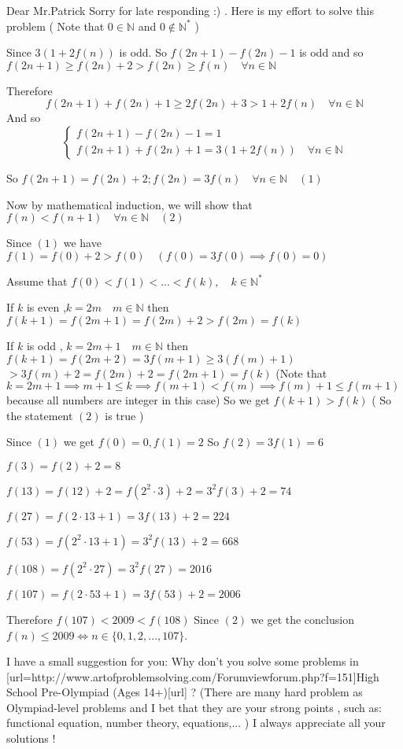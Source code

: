 \begin{solution}
	Dear Mr.Patrick
Sorry for late responding :) . 
Here is my effort  to solve this problem ( Note that $0\in\mathbb{N}$ and $0\notin\mathbb{N}^*$ ) 


Since $3\left (1+2f(n)\right )$ is odd. So $f(2n+1)-f(2n)-1$ is odd and so $f(2n+1)\geq f(2n)+2>f(2n)\geq f(n) \quad \forall n\in\mathbb{N}$

Therefore \[f(2n+1)+f(2n)+1\geq 2f(2n)+3>1+2f(n)\quad \forall n\in\mathbb{N}\] And so
\[ \begin{cases} f(2n+1)-f(2n)-1=1\\f(2n+1)+f(2n)+1=3\left ( 1+2f(n)\right )\quad \forall n\in\mathbb{N}\end{cases} \]

So $f(2n+1)=f(2n)+2;f(2n)=3f(n) \quad  \forall n\in\mathbb{N} \quad (1)$

Now by mathematical induction, we will show that $f(n)<f(n+1)\quad  \forall n\in\mathbb{N} \quad (2)$

Since $(1)$ we have $f(1)=f(0)+2>f(0) \quad (f(0)=3f(0)\implies f(0)=0)$

Assume that $f(0)<f(1)<...<f(k), \quad k\in\mathbb{N}^*$

If $k$ is even ,$k=2m \quad m\in\mathbb{N}$  then $f(k+1)=f(2m+1)=f(2m)+2>f(2m)=f(k)$

If $k$ is odd , $k=2m+1 \quad m\in\mathbb{N}$ then 
$f(k+1)=f(2m+2)=3f(m+1)\geq 3(f(m)+1) $ $>3f(m)+2=f(2m)+2=f(2m+1)=f(k)$ 
(Note that $k=2m+1\implies m+1\leq k\implies f(m+1)< f(m) \implies f(m)+1\leq f(m+1)$ because all numbers are integer in this case)
So we get $f(k+1)>f(k)$ ( So the statement $(2)$ is true )

Since $(1)$ we get $f(0)=0,f(1)=2$
So
$f(2)=3f(1)=6$

$f(3)=f(2)+2=8$

$f(13)=f(12)+2=f(2^2\cdot 3)+2=3^2f(3)+2=74$

 $f(27)=f(2\cdot 13+1)=3f(13)+2=224$

$f(53)=f(2^2\cdot 13+1)=3^2f(13)+2=668$

$f(108)=f(2^2\cdot 27)=3^2f(27)=2016$

$f(107)=f(2\cdot 53+1)=3f(53)+2=2006$

Therefore $f(107)<2009<f(108)$
Since $(2)$ we get the conclusion  $ \boxed{ f(n)\le 2009\iff n\in\{0,1,2,...,107\}} $.





I have a small suggestion for you: Why don't you solve some problems in [url=http://www.artofproblemsolving.com/Forum\/viewforum.php?f=151]High School Pre-Olympiad (Ages 14+)[\/url] ?
 (There are many hard problem as  Olympiad-level  problems and I bet that  they are your strong points , such as: functional equation, number theory, equations,...  )
I always appreciate  all your solutions !
\end{solution}



